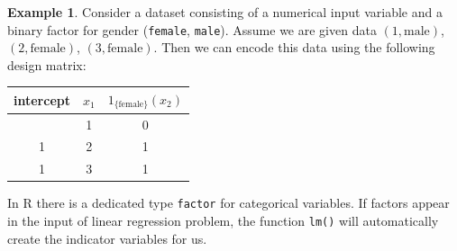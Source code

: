 \documentclass[
  a4paper,
]{article}
\theoremstyle{definition}
\theoremstyle{definition}
\newtheorem{example}{Example}[section]
\theoremstyle{definition}
\theoremstyle{definition}
\theoremstyle{remark}
\begin{document}
\begin{example}

Consider a dataset consisting of a numerical input variable
and a binary factor for gender (\texttt{female}, \texttt{male}).
Assume we are given data
\((1, \mathrm{male})\), \((2, \mathrm{female})\), \((3, \mathrm{female})\).
Then we can encode this data using the following design matrix:

{\def\LTcaptype{} %
\begin{longtable}[]{@{}ccc@{}}
\toprule\noalign{}
intercept & \(x_1\) & \(1_\mathrm{\{female\}}(x_2)\) \\
\midrule\noalign{}
\endhead
\bottomrule\noalign{}
\endlastfoot
1 & 1 & 0 \\
1 & 2 & 1 \\
1 & 3 & 1 \\
\end{longtable}
}

\end{example}

In R there is a dedicated type \texttt{factor} for categorical variables.
If factors appear in the input of linear regression problem, the
function \texttt{lm()} will automatically create the indicator variables
for us.
\end{document}
